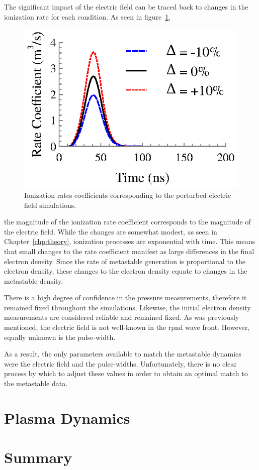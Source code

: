 The significant impact of the electric field can be traced back to changes in
the ionization rate for each condition. As seen in figure~\ref{fig:ionrates},
\begin{figure}
  \centering
  \includegraphics{./chapters/modeling/figures/ionrates.eps}
  \caption{Ionization rates coefficients corresponding to the perturbed electric
  field simulations.}
  \label{fig:ionrates}
\end{figure}
the magnitude of the ionization rate coefficient corresponds to the magnitude of
the electric field. While the changes are somewhat modest, as seen in
Chapter~\ref{chp:theory}, ionization processes are exponential with time. This
means that small changes to the rate coefficient manifest as large differences
in the final electron density. Since the rate of metastable generation is
proportional to the electron density, these changes to the electron density
equate to changes in the metastable density.

There is a high degree of confidence in the pressure measurements, therefore it
remained fixed throughout the simulations. Likewise, the initial electron
density measurements are considered reliable and remained fixed. As was
previously mentioned, the electric field is not well-known in the \acs{rpnd}
wave front. However, equally unknown is the pulse-width.

As a result,
the only parameters available to match the metastable dynamics were the electric
field and the pulse-widths. Unfortunately, there is no clear process by which to
adjust these values in order to obtain an optimal match to the metastable data.




\section{Plasma Dynamics}



\section{Summary}


